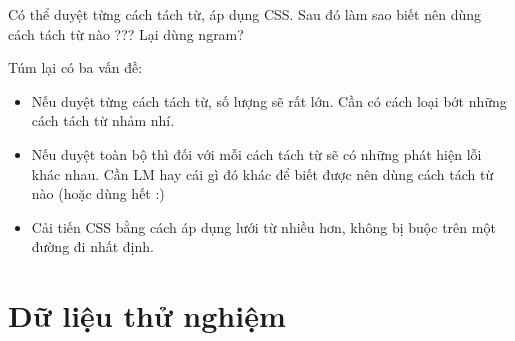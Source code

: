 \documentclass[a4paper,oneside,14pt]{extbook} %
\begin{document}
Có thể duyệt từng cách tách từ, áp dụng CSS. Sau đó làm sao biết nên
dùng cách tách từ nào ??? Lại dùng n\-gram?

Túm lại có ba vấn đề:
\begin{itemize}
\item Nếu duyệt từng cách tách từ, số lượng sẽ rất lớn. Cần có cách
  loại bớt những cách tách từ nhảm nhí.
\item Nếu duyệt toàn bộ thì đối với mỗi cách tách từ sẽ có những phát
  hiện lỗi khác nhau. Cần LM hay cái gì đó khác để biết được nên dùng
  cách tách từ nào (hoặc dùng hết :)
\item Cải tiến CSS bằng cách áp dụng lưới từ nhiều hơn, không bị buộc
  trên một đường đi nhất định.
\end{itemize}

\appendix\eject{}
\chapter{Dữ liệu thử nghiệm}

\eject{}\listoffigures

\eject{}\listoftables

\eject{}


\end{document}
